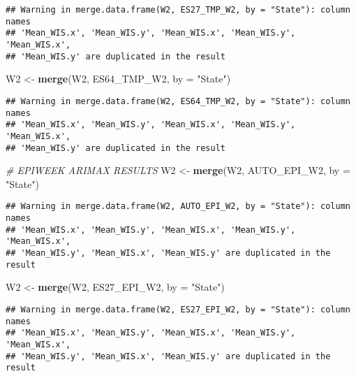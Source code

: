 \documentclass[
]{article}
\newenvironment{Shaded}{\begin{snugshade}}{\end{snugshade}}
\newcommand{\AttributeTok}[1]{\textcolor[rgb]{0.13,0.29,0.53}{#1}}
\newcommand{\CommentTok}[1]{\textcolor[rgb]{0.56,0.35,0.01}{\textit{#1}}}
\newcommand{\FunctionTok}[1]{\textcolor[rgb]{0.13,0.29,0.53}{\textbf{#1}}}
\newcommand{\NormalTok}[1]{#1}
\newcommand{\OtherTok}[1]{\textcolor[rgb]{0.56,0.35,0.01}{#1}}
\newcommand{\StringTok}[1]{\textcolor[rgb]{0.31,0.60,0.02}{#1}}
\begin{document}
\begin{verbatim}
## Warning in merge.data.frame(W2, ES27_TMP_W2, by = "State"): column names
## 'Mean_WIS.x', 'Mean_WIS.y', 'Mean_WIS.x', 'Mean_WIS.y', 'Mean_WIS.x',
## 'Mean_WIS.y' are duplicated in the result
\end{verbatim}

\begin{Shaded}
\begin{Highlighting}[]
\NormalTok{W2 }\OtherTok{\textless{}{-}} \FunctionTok{merge}\NormalTok{(W2, ES64\_TMP\_W2, }\AttributeTok{by =} \StringTok{"State"}\NormalTok{)}
\end{Highlighting}
\end{Shaded}

\begin{verbatim}
## Warning in merge.data.frame(W2, ES64_TMP_W2, by = "State"): column names
## 'Mean_WIS.x', 'Mean_WIS.y', 'Mean_WIS.x', 'Mean_WIS.y', 'Mean_WIS.x',
## 'Mean_WIS.y' are duplicated in the result
\end{verbatim}

\begin{Shaded}
\begin{Highlighting}[]
\CommentTok{\# EPIWEEK ARIMAX RESULTS}
\NormalTok{W2 }\OtherTok{\textless{}{-}} \FunctionTok{merge}\NormalTok{(W2, AUTO\_EPI\_W2, }\AttributeTok{by =} \StringTok{"State"}\NormalTok{)}
\end{Highlighting}
\end{Shaded}

\begin{verbatim}
## Warning in merge.data.frame(W2, AUTO_EPI_W2, by = "State"): column names
## 'Mean_WIS.x', 'Mean_WIS.y', 'Mean_WIS.x', 'Mean_WIS.y', 'Mean_WIS.x',
## 'Mean_WIS.y', 'Mean_WIS.x', 'Mean_WIS.y' are duplicated in the result
\end{verbatim}

\begin{Shaded}
\begin{Highlighting}[]
\NormalTok{W2 }\OtherTok{\textless{}{-}} \FunctionTok{merge}\NormalTok{(W2, ES27\_EPI\_W2, }\AttributeTok{by =} \StringTok{"State"}\NormalTok{)}
\end{Highlighting}
\end{Shaded}

\begin{verbatim}
## Warning in merge.data.frame(W2, ES27_EPI_W2, by = "State"): column names
## 'Mean_WIS.x', 'Mean_WIS.y', 'Mean_WIS.x', 'Mean_WIS.y', 'Mean_WIS.x',
## 'Mean_WIS.y', 'Mean_WIS.x', 'Mean_WIS.y' are duplicated in the result
\end{verbatim}
\end{document}
